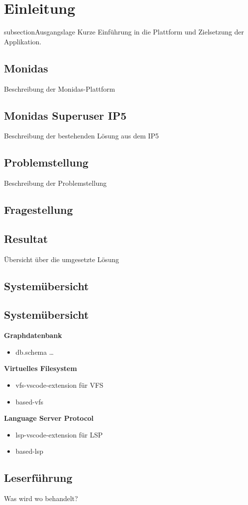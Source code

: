 \section{Einleitung}

subsection{Ausgangslage}
Kurze Einführung in die Plattform und Zielsetzung der Applikation.

\subsection{Monidas}
Beschreibung der Monidas-Plattform

\subsection{Monidas Superuser IP5}
Beschreibung der bestehenden Lösung aus dem IP5

\subsection{Problemstellung}
Beschreibung der Problemstellung

\subsection{Fragestellung}


\subsection{Resultat}
Übersicht über die umgesetzte Lösung

\subsection{Systemübersicht}

\subsection{Systemübersicht}

\textbf{Graphdatenbank}
\begin{itemize}
	\item db.schema …
\end{itemize}

\textbf{Virtuelles Filesystem}
\begin{itemize}
	\item vfs-vscode-extension für VFS
	\item based-vfs
\end{itemize}

\textbf{Language Server Protocol}
\begin{itemize}
	\item lsp-vscode-extension für LSP
	\item based-lsp
\end{itemize}

\subsection{Leserführung}
Was wird wo behandelt?